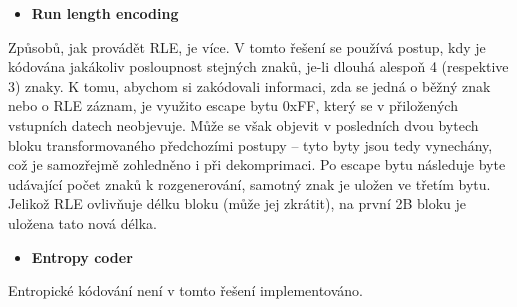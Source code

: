 \documentclass[11pt,a4paper]{article}
\begin{document}
\begin{itemize}[leftmargin=0cm]
\item{\textbf{Run length encoding}}
\end{itemize}
Způsobů, jak provádět RLE, je více. V tomto řešení se používá postup, kdy je kódována jakákoliv posloupnost stejných znaků, je-li dlouhá alespoň 4 (respektive 3) znaky. K tomu, abychom si zakódovali informaci, zda se jedná o běžný znak nebo o RLE záznam, je využito escape bytu 0xFF, který se v přiložených vstupních datech neobjevuje. Může se však objevit v posledních dvou bytech bloku transformovaného předchozími postupy -- tyto byty jsou tedy vynechány, což je samozřejmě zohledněno i při dekomprimaci. Po escape bytu následuje byte udávající počet znaků k rozgenerování, samotný znak je uložen ve třetím bytu. Jelikož RLE ovlivňuje délku bloku (může jej zkrátit), na první 2B bloku je uložena tato nová délka.



\begin{itemize}[leftmargin=0cm]
\item{\textbf{Entropy coder}}
\end{itemize}
Entropické kódování není v tomto řešení implementováno.
\end{document}
